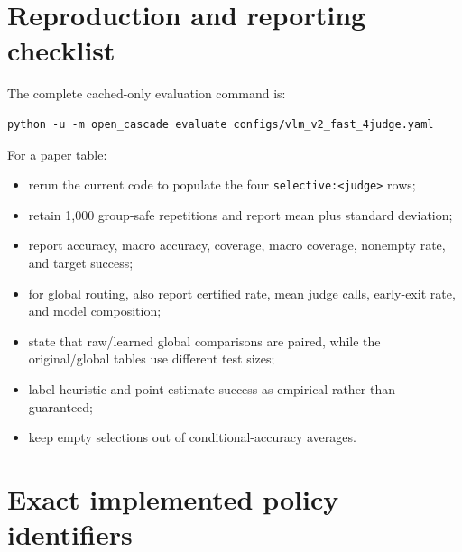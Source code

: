 \documentclass[10pt]{article}
\DeclareRobustCommand{\method}[1]{\nolinkurl{#1}}
\begin{document}
\section{Reproduction and reporting checklist}

The complete cached-only evaluation command is:
\begin{verbatim}
python -u -m open_cascade evaluate configs/vlm_v2_fast_4judge.yaml
\end{verbatim}

For a paper table:
\begin{itemize}
  \item rerun the current code to populate the four \method{selective:<judge>} rows;
  \item retain 1,000 group-safe repetitions and report mean plus standard deviation;
  \item report accuracy, macro accuracy, coverage, macro coverage, nonempty rate, and target success;
  \item for global routing, also report certified rate, mean judge calls, early-exit rate, and model composition;
  \item state that raw/learned global comparisons are paired, while the original/global tables use different test sizes;
  \item label heuristic and point-estimate success as empirical rather than guaranteed;
  \item keep empty selections out of conditional-accuracy averages.
\end{itemize}

\appendix
\section{Exact implemented policy identifiers}
\end{document}
